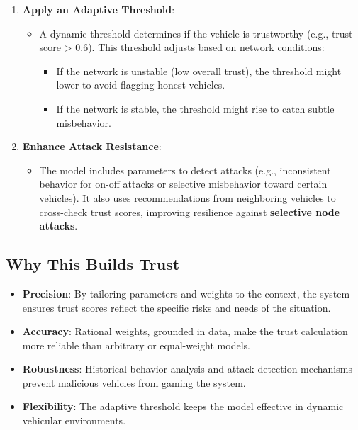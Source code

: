 \documentclass{article}
\begin{document}
\begin{enumerate}
    \item \textbf{Apply an Adaptive Threshold}:
    \begin{itemize}
        \item A dynamic threshold determines if the vehicle is trustworthy (e.g., trust score > 0.6). This threshold adjusts based on network conditions:
        \begin{itemize}
            \item If the network is unstable (low overall trust), the threshold might lower to avoid flagging honest vehicles.
            \item If the network is stable, the threshold might rise to catch subtle misbehavior.
        \end{itemize}
    \end{itemize}
    
    \item \textbf{Enhance Attack Resistance}:
    \begin{itemize}
        \item The model includes parameters to detect attacks (e.g., inconsistent behavior for on-off attacks or selective misbehavior toward certain vehicles). It also uses recommendations from neighboring vehicles to cross-check trust scores, improving resilience against \textbf{selective node attacks}.
    \end{itemize}
\end{enumerate}

\subsection*{Why This Builds Trust}
\begin{itemize}
    \item \textbf{Precision}: By tailoring parameters and weights to the context, the system ensures trust scores reflect the specific risks and needs of the situation.
    \item \textbf{Accuracy}: Rational weights, grounded in data, make the trust calculation more reliable than arbitrary or equal-weight models.
    \item \textbf{Robustness}: Historical behavior analysis and attack-detection mechanisms prevent malicious vehicles from gaming the system.
    \item \textbf{Flexibility}: The adaptive threshold keeps the model effective in dynamic vehicular environments.
\end{itemize}
\end{document}
